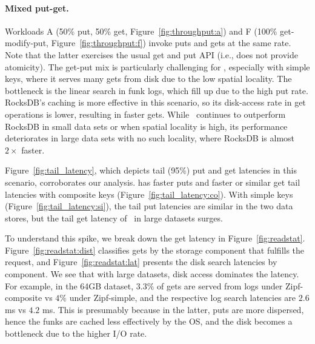 
\paragraph{Mixed put-get.} Workloads A (50\% put, 50\% get, Figure~\ref{fig:throughput:a}) and 
F (100\% get-modify-put, Figure~\ref{fig:throughput:f}) invoke puts and gets at the same rate. Note that the latter exercises the usual get and put API (i.e., does not provide atomicity). 
The get-put mix is particularly challenging for \sys, especially with simple keys, where it serves many gets from disk due to the
low spatial locality. The bottleneck is the linear search in funk logs, which  fill up due to the high put rate.
RocksDB's caching is more effective in this scenario, so its disk-access rate in get operations is lower,  resulting in faster gets. 
While \sys\ continues to outperform RocksDB in small data sets or when spatial locality is high, its performance deteriorates in 
large data sets with no such locality, where RocksDB is almost $2\times$ faster.


Figure~\ref{fig:tail_latency}, which depicts tail (95\%) put and get latencies in this scenario, 
corroborates our analysis. \sys\/ has faster puts and faster or similar get tail latencies with composite keys
(Figure~\ref{fig:tail_latency:co}). With simple keys (Figure~\ref{fig:tail_latency:si}),  
the tail put latencies are similar in the two data stores, but the tail get latency of \sys\ 
in large datasets surges.

To understand this spike, we break down the get latency in  Figure~\ref{fig:readstat}. 
Figure~\ref{fig:readstat:dist} classifies gets by the storage  component 
that fulfills the request, and Figure~\ref{fig:readstat:lat} presents the disk search latencies by component. 
We see that with large datasets, disk access dominates the latency.
For example, in the 64GB dataset, $3.3\%$ of gets are served from logs under Zipf-composite vs $4\%$ under Zipf-simple,
and the respective log search latencies are $2.6$ ms vs $4.2$ ms. This is presumably because in the latter, puts are more dispersed, 
hence the funks are cached less effectively by the OS, and the disk becomes a bottleneck due to the higher I/O rate.




